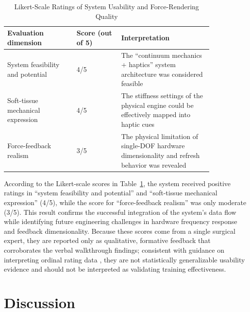 \documentclass{ieeeaccess}
\begin{document}
\begin{table}[htbp]
\caption{Likert-Scale Ratings of System Usability and Force-Rendering Quality}
\label{tab:likert}
\centering
\footnotesize
\renewcommand{\arraystretch}{1.15}
\begin{tabular}{|p{0.29\linewidth}|p{0.18\linewidth}|p{0.37\linewidth}|}
\hline
Evaluation dimension & Score (out of 5) & Interpretation \\
\hline
System feasibility and potential & 4/5 & The ``continuum mechanics + haptics'' system architecture was considered feasible \\
\hline
Soft-tissue mechanical expression & 4/5 & The stiffness settings of the physical engine could be effectively mapped into haptic cues \\
\hline
Force-feedback realism & 3/5 & The physical limitation of single-DOF hardware dimensionality and refresh behavior was revealed \\
\hline
\end{tabular}
\end{table}

According to the Likert-scale scores in Table~\ref{tab:likert}, the system received positive ratings in ``system feasibility and potential'' and ``soft-tissue mechanical expression'' (4/5), while the score for ``force-feedback realism'' was only moderate (3/5). This result confirms the successful integration of the system's data flow while identifying future engineering challenges in hardware frequency response and feedback dimensionality. Because these scores come from a single surgical expert, they are reported only as qualitative, formative feedback that corroborates the verbal walkthrough findings; consistent with guidance on interpreting ordinal rating data \cite{sullivan2013analyzing}, they are not statistically generalizable usability evidence and should not be interpreted as validating training effectiveness.

\section{Discussion}
\end{document}
